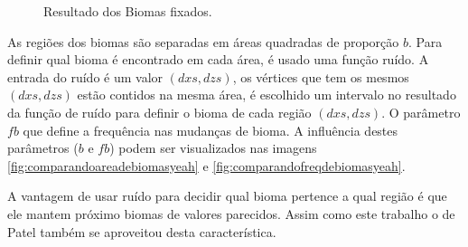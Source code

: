 \begin{figure}[H]
     \caption{Resultado dos Biomas fixados.}
     
     \label{fig:bssComBiomasFixados}
\end{figure}

As regiões dos biomas são separadas em áreas quadradas de proporção $b$. Para definir
qual bioma é encontrado em cada área, é usado uma função ruído.
A entrada do ruído é um valor $(dxs, dzs)$, os vértices que tem os mesmos $(dxs, dzs)$
estão contidos na mesma área, é escolhido um intervalo no resultado da função de ruído
para definir o bioma de cada região $(dxs, dzs)$. O parâmetro $fb$ que define a frequência nas
mudanças de bioma. A influência destes parâmetros ($b$ e $fb$) podem ser visualizados nas imagens \ref{fig:comparandoareadebiomasyeah} e \ref{fig:comparandofreqdebiomasyeah}.

A vantagem de usar ruído para decidir qual bioma pertence a qual 
região é que ele mantem próximo biomas de valores parecidos. Assim como este trabalho o de Patel
\cite{patel2010polygonal} também se aproveitou desta característica.

